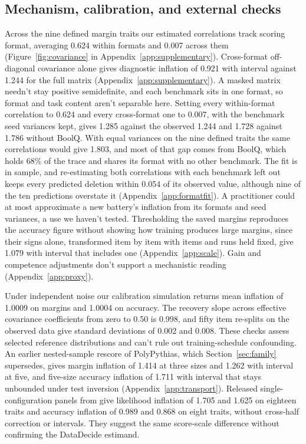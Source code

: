 \subsection{Mechanism, calibration, and external checks}
Across the nine defined margin traits our estimated correlations track scoring format, averaging 0.624 within formats and 0.007 across them (Figure~\ref{fig:covariance} in Appendix~\ref{app:supplementary}). Cross-format off-diagonal covariance alone gives diagnostic inflation of 0.921 with interval  against 1.244 for the full matrix (Appendix~\ref{app:supplementary}). A masked matrix needn't stay positive semidefinite, and each benchmark sits in one format, so format and task content aren't separable here. Setting every within-format correlation to 0.624 and every cross-format one to 0.007, with the benchmark seed variances kept, gives 1.285 against the observed 1.244 and 1.728 against 1.786 without BoolQ. With equal variances on the nine defined traits the same correlations would give 1.803, and most of that gap comes from BoolQ, which holds 68\% of the trace and shares its format with no other benchmark. The fit is in sample, and re-estimating both correlations with each benchmark left out keeps every predicted deletion within 0.054 of its observed value, although nine of the ten predictions overstate it (Appendix~\ref{app:formatfit}). A practitioner could at most approximate a new battery's inflation from its formats and seed variances, a use we haven't tested. Thresholding the saved margins reproduces the accuracy figure without showing how training produces large margins, since their signs alone, transformed item by item with items and runs held fixed, give 1.079 with interval  that includes one (Appendix~\ref{app:scale}). Gain and competence adjustments don't support a mechanistic reading (Appendix~\ref{app:proxy}).

Under independent noise our calibration simulation returns mean inflation of 1.0009 on margins and 1.0004 on accuracy. The recovery slope across effective covariance coefficients from zero to 0.50 is 0.998, and fifty item re-splits on the observed data give standard deviations of 0.002 and 0.008. These checks assess selected reference distributions and can't rule out training-schedule confounding. An earlier nested-sample rescore of PolyPythias, which Section~\ref{sec:family} supersedes, gives margin inflation of 1.414 at three sizes and 1.262 with interval  at five, and five-size accuracy inflation of 1.711 with interval  that stays unbounded under test inversion (Appendix~\ref{app:transport}). Released single-configuration panels from \citet{heineman2025} give likelihood inflation of 1.705 and 1.625 on eighteen traits and accuracy inflation of 0.989 and 0.868 on eight traits, without cross-half correction or intervals. They suggest the same score-scale difference without confirming the DataDecide estimand.


